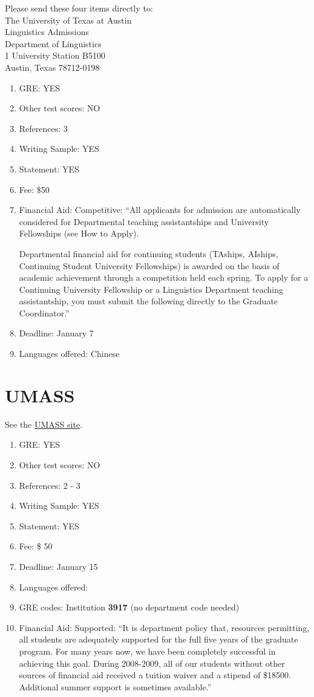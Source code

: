 \documentclass[11pt]{article}
\begin{document}
Please send these four items directly to:\\
The University of Texas at Austin\\
Linguistics Admissions\\
Department of Linguistics\\
1 University Station B5100\\
Austin, Texas 78712-0198\\


\begin{enumerate}
\item GRE: YES
\item Other test scores: NO
\item References: 3
\item Writing Sample: YES
\item Statement: YES
\item Fee: \$50
\item Financial Aid: Competitive: ``All applicants for admission are automatically considered for Departmental teaching assistantships and University Fellowships (see How to Apply).

Departmental financial aid for continuing students (TAships, AIships, Continuing Student University Fellowships) is awarded on the basis of academic achievement through a competition held each spring. To apply for a Continuing University Fellowship or a Linguistics Department teaching assistantship, you must submit the following directly to the Graduate Coordinator.''
\item Deadline: January 7
\item Languages offered: Chinese
\end{enumerate}

\section{UMASS}
See the \href{http://www.umass.edu/linguist/graduate_program/application_process.shtml}{UMASS site}.
\begin{enumerate}
\item GRE: YES
\item Other test scores: NO
\item References: 2 - 3
\item Writing Sample: YES
\item Statement: YES 
\item Fee: \$ 50
\item Deadline: January 15
\item Languages offered:
\item GRE codes: Institution {\bf 3917} (no department code needed) 
\item Financial Aid: Supported: ``It is department policy that, resources permitting, all students are adequately supported for the full five years of the graduate program. For many years now, we have been completely successful in achieving this goal. During 2008-2009, all of our students without other sources of financial aid received a tuition waiver and a stipend of \$18500. Additional summer support is sometimes available.''
\end{enumerate}
\end{document}
